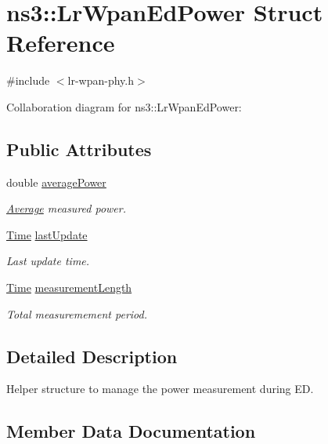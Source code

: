 \hypertarget{structns3_1_1LrWpanEdPower}{}\section{ns3\+:\+:Lr\+Wpan\+Ed\+Power Struct Reference}
\label{structns3_1_1LrWpanEdPower}


{\ttfamily \#include $<$lr-\/wpan-\/phy.\+h$>$}



Collaboration diagram for ns3\+:\+:Lr\+Wpan\+Ed\+Power\+:
\subsection*{Public Attributes}
\begin{DoxyCompactItemize}
\item 
double \hyperlink{structns3_1_1LrWpanEdPower_a1c454915534c342f9706e6e42006b388}{average\+Power}
\begin{DoxyCompactList}\small\item\em \hyperlink{classns3_1_1Average}{Average} measured power. \end{DoxyCompactList}\item 
\hyperlink{classns3_1_1Time}{Time} \hyperlink{structns3_1_1LrWpanEdPower_ac652b200f53980a1632776b9ee2c8456}{last\+Update}
\begin{DoxyCompactList}\small\item\em Last update time. \end{DoxyCompactList}\item 
\hyperlink{classns3_1_1Time}{Time} \hyperlink{structns3_1_1LrWpanEdPower_ad0843da1bc59c22ff31bbd2023f61dc0}{measurement\+Length}
\begin{DoxyCompactList}\small\item\em Total measuremement period. \end{DoxyCompactList}\end{DoxyCompactItemize}


\subsection{Detailed Description}
Helper structure to manage the power measurement during ED. 

\subsection{Member Data Documentation}
